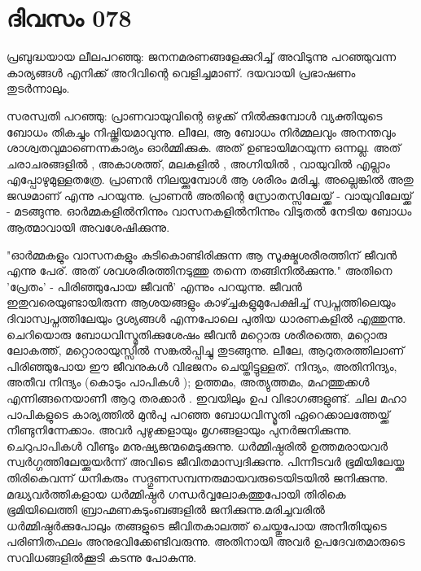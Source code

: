  
\section{ദിവസം 078}


പ്രബുദ്ധയായ ലീലപറഞ്ഞു: ജനനമരണങ്ങളേക്കുറിച്ച്‌ അവിടുന്നു പറഞ്ഞുവന്ന കാര്യങ്ങള്‍ എനിക്ക്‌ അറിവിന്റെ വെളിച്ചമാണ്‌. ദയവായി പ്രഭാഷണം തുടര്‍ന്നാലും. 

സരസ്വതി പറഞ്ഞു: പ്രാണവായുവിന്റെ ഒഴുക്ക്‌ നില്‍ക്കുമ്പോള്‍ വ്യക്തിയുടെ ബോധം തികച്ചും നിഷ്ക്രിയമാവുന്നു. ലീലേ, ആ ബോധം നിര്‍മ്മലവും അനന്തവും ശാശ്വതവുമാണെന്നകാര്യം ഓര്‍മ്മിക്കുക. അത്‌ ഉണ്ടായിമറയുന്ന ഒന്നല്ല. അത്‌ ചരാചരങ്ങളില്‍ , അകാശത്ത്‌, മലകളില്‍ , അഗ്നിയില്‍ , വായുവില്‍ എല്ലാം എപ്പോഴുമുള്ളതത്രേ. പ്രാണന്‍ നിലയ്ക്കുമ്പോള്‍ ആ ശരീരം മരിച്ചു, അല്ലെങ്കില്‍ അതു ജഢമാണ്‌ എന്നു പറയുന്നു. പ്രാണന്‍ അതിന്റെ സ്രോതസ്സിലേയ്ക്ക്‌ - വായുവിലേയ്ക്ക്‌ - മടങ്ങുന്നു. ഓര്‍മ്മകളില്‍നിന്നും വാസനകളില്‍നിന്നും വിടുതല്‍ നേടിയ ബോധം ആത്മാവായി അവശേഷിക്കുന്നു.

"ഓര്‍മ്മകളും വാസനകളും കുടികൊണ്ടിരിക്കുന്ന ആ സൂക്ഷ്മശരീരത്തിന്‌ ജീവന്‍ എന്നു പേര്‌. അത്‌ ശവശരീരത്തിനടുത്തു തന്നെ തങ്ങിനില്‍ക്കുന്നു." അതിനെ 'പ്രേതം' - പിരിഞ്ഞുപോയ ജീവന്‍' എന്നും പറയുന്നു. ജീവന്‍ ഇതുവരെയുണ്ടായിരുന്ന ആശയങ്ങളും കാഴ്ച്ചകളുമുപേക്ഷിച്ച്‌ സ്വപ്നത്തിലെയും ദിവാസ്വപ്നത്തിലേയും ദൃശ്യങ്ങള്‍ എന്നപോലെ പുതിയ ധാരണകളില്‍ എത്തുന്നു. ചെറിയൊരു ബോധവിസ്മൃതിക്കുശേഷം ജീവന്‍ മറ്റൊരു ശരീരത്തെ, മറ്റൊരു ലോകത്ത്‌, മറ്റൊരായുസ്സില്‍ സങ്കല്‍പ്പിച്ചു തുടങ്ങുന്നു. ലീലേ, ആറുതരത്തിലാണ്‌ പിരിഞ്ഞുപോയ ഈ ജീവനുകള്‍ വിഭജനം ചെയ്തിട്ടുള്ളത്‌. നിന്ദ്യം, അതിനിന്ദ്യം, അതീവ നിന്ദ്യം (കൊടും പാപികള്‍ ); ഉത്തമം, അത്യുത്തമം, മഹത്തുക്കള്‍ എന്നിങ്ങനെയാണീ ആറു തരക്കാര്‍ . ഇവയിലും ഉപ വിഭാഗങ്ങളുണ്ട്‌. ചില മഹാ പാപികളുടെ കാര്യത്തില്‍ മുന്‍പു പറഞ്ഞ ബോധവിസ്മൃതി ഏറെക്കാലത്തേയ്ക്ക്‌ നീണ്ടുനിന്നേക്കാം. അവര്‍ പുഴുക്കളായും മൃഗങ്ങളായും പുനര്‍ജനിക്കുന്നു. ചെറുപാപികള്‍ വീണ്ടും മനുഷ്യജന്മമെടുക്കുന്നു. ധര്‍മ്മിഷ്ഠരില്‍ ഉത്തമരായവര്‍ സ്വര്‍ഗ്ഗത്തിലേയ്ക്കുയര്‍ന്ന് അവിടെ ജീവിതമാസ്വദിക്കുന്നു. പിന്നീടവര്‍ ഭൂമിയിലേയ്ക്കു തിരികെവന്ന് ധനികരും സദ്ഗുണസമ്പന്നരുമായവരുടെയിടയില്‍ ജനിക്കുന്നു. മദ്ധ്യവര്‍ത്തികളായ ധര്‍മ്മിഷ്ഠര്‍ ഗന്ധര്‍വ്വലോകത്തുപോയി തിരികെ ഭൂമിയിലെത്തി ബ്രാഹ്മണകുടുംബങ്ങളില്‍ ജനിക്കുന്നു.മരിച്ചവരില്‍ ധര്‍മ്മിഷ്ഠര്‍ക്കുപോലും തങ്ങളുടെ ജീവിതകാലത്ത്‌ ചെയ്തുപോയ അനീതിയുടെ പരിണിതഫലം അനുഭവിക്കേണ്ടിവരുന്നു. അതിനായി അവര്‍ ഉപദേവതമാരുടെ സവിധങ്ങളില്‍ക്കൂടി കടന്നു പോകുന്നു.

